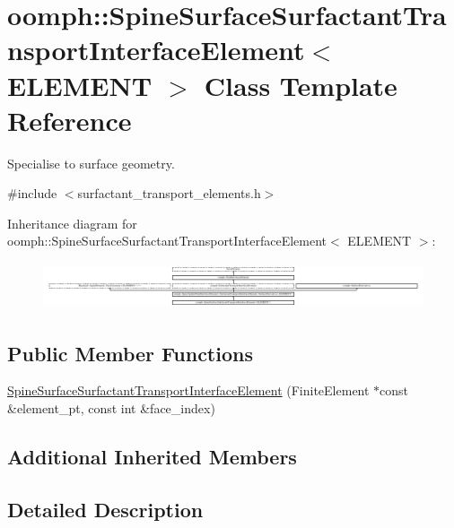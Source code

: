 \hypertarget{classoomph_1_1SpineSurfaceSurfactantTransportInterfaceElement}{}\section{oomph\+:\+:Spine\+Surface\+Surfactant\+Transport\+Interface\+Element$<$ E\+L\+E\+M\+E\+NT $>$ Class Template Reference}
\label{classoomph_1_1SpineSurfaceSurfactantTransportInterfaceElement}


Specialise to surface geometry.  




{\ttfamily \#include $<$surfactant\+\_\+transport\+\_\+elements.\+h$>$}

Inheritance diagram for oomph\+:\+:Spine\+Surface\+Surfactant\+Transport\+Interface\+Element$<$ E\+L\+E\+M\+E\+NT $>$\+:\begin{figure}[H]
\begin{center}
\leavevmode
\includegraphics[height=1.390959cm]{classoomph_1_1SpineSurfaceSurfactantTransportInterfaceElement}
\end{center}
\end{figure}
\subsection*{Public Member Functions}
\begin{DoxyCompactItemize}
\item 
\hyperlink{classoomph_1_1SpineSurfaceSurfactantTransportInterfaceElement_aa3014e796ec7e0bfa26824fc42184d06}{Spine\+Surface\+Surfactant\+Transport\+Interface\+Element} (Finite\+Element $\ast$const \&element\+\_\+pt, const int \&face\+\_\+index)
\end{DoxyCompactItemize}
\subsection*{Additional Inherited Members}


\subsection{Detailed Description}
